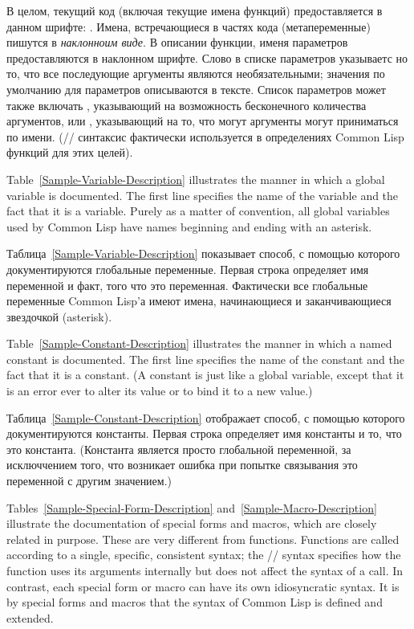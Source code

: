В целом, текущий код (включая текущие имена функций) предоставляется в данном
шрифте: .
Имена, встречающиеся в частях кода (метапеременные) пишутся в {\it наклонноим
виде}. В описании функции, именя параметров предоставляются в наклонном
шрифте. Слово  в списке параметров указываетс но то, что все
последующие аргументы являются необязательными; значения по умолчанию для
параметров описываются в тексте. Список параметров может также
включать , указывающий на возможность бесконечного количества
аргументов, или , указывающий на то, что могут аргументы могут
приниматься по имени.
(// синтаксис фактически используется в
определениях Common Lisp функций для этих целей).

Table~\ref{Sample-Variable-Description} illustrates the manner in
which a global variable is documented.  The first line specifies the
name of the variable and the fact that it is a variable.
Purely as a matter of convention, all global variables used
by Common Lisp have names beginning and ending with an asterisk.

Таблица~\ref{Sample-Variable-Description} показывает способ, с помощью которого
документируются глобальные переменные. Первая строка определяет имя переменной и 
факт, того что это переменная.
Фактически все глобальные переменные Common Lisp'а имеют имена, начинающиеся и
заканчивающиеся звездочкой (asterisk).


Table~\ref{Sample-Constant-Description} illustrates the manner in
which a named constant is documented.  The first line specifies the
name of the constant and the fact that it is a constant.
(A constant is just like a global variable, except that it is
an error ever to alter its value or to bind it to a new value.)

Таблица~\ref{Sample-Constant-Description} отображает способ, с помощью которого
документируются константы. Первая строка определяет имя константы и то, что это
константа.
(Константа является просто глобальной переменной, за исключчением того, что
возникает ошибка при попытке связывания это переменной с другим значением.)

Tables~\ref{Sample-Special-Form-Description}
and~\ref{Sample-Macro-Description} illustrate the documentation
of special forms and macros, which are closely related in purpose.
These are very different from functions.
Functions are called according to a single, specific, consistent syntax;
the // syntax specifies how the function uses its arguments
internally but does not affect the syntax of a call.
In contrast, each special form or macro can have its own idiosyncratic syntax.
It is by special forms and macros that the syntax of Common Lisp is defined
and extended.

